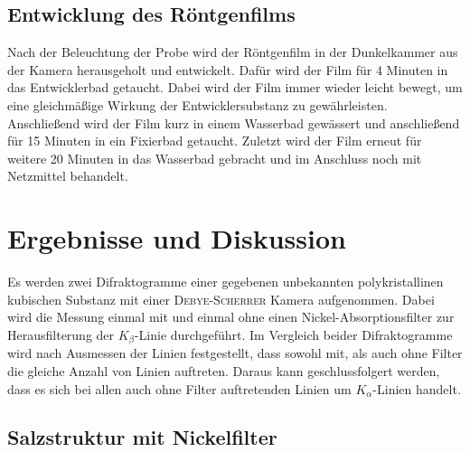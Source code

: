 \documentclass[a4paper,twoside,final]{article}
\begin{document}
\subsection{Entwicklung des Röntgenfilms}
Nach der Beleuchtung der Probe wird der Röntgenfilm in der Dunkelkammer aus der Kamera herausgeholt und entwickelt. Dafür wird der Film für 4 Minuten in das Entwicklerbad getaucht. Dabei wird der Film immer wieder leicht bewegt, um eine gleichmäßige Wirkung der Entwicklersubstanz zu gewährleisten.\\
Anschließend wird der Film kurz in einem Wasserbad gewässert und anschließend für 15 Minuten in ein Fixierbad getaucht. Zuletzt wird der Film erneut für weitere 20 Minuten in das Wasserbad gebracht und im Anschluss noch mit Netzmittel behandelt.


\newpage
\section{Ergebnisse und Diskussion}
Es werden zwei Difraktogramme einer gegebenen unbekannten polykristallinen kubischen Substanz mit einer \textsc{Debye-Scherrer} Kamera aufgenommen. Dabei wird die Messung einmal mit und einmal ohne einen Nickel-Absorptionsfilter zur Herausfilterung der $K_{\beta}$-Linie durchgeführt. Im Vergleich beider Difraktogramme wird nach Ausmessen der Linien festgestellt, dass sowohl mit, als auch ohne Filter die gleiche Anzahl von Linien auftreten. Daraus kann geschlussfolgert werden, dass es sich bei allen auch ohne Filter auftretenden Linien um $K_{\alpha}$-Linien handelt.
\subsection{Salzstruktur mit Nickelfilter}
\end{document}

